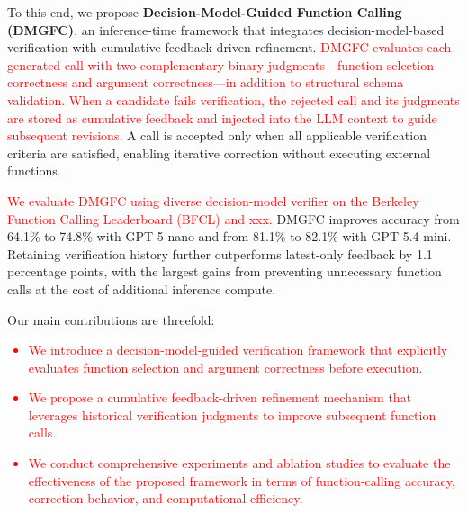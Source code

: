 To this end, we propose \textbf{Decision-Model-Guided Function Calling (DMGFC)}, an inference-time framework that integrates decision-model-based verification with cumulative feedback-driven refinement. \textcolor{red}{DMGFC evaluates each generated call with two complementary binary judgments---function selection correctness and argument correctness---in addition to structural schema validation. When a candidate fails verification, the rejected call and its judgments are stored as cumulative feedback and injected into the LLM context to guide subsequent revisions.} A call is accepted only when all applicable verification criteria are satisfied, enabling iterative correction without executing external functions.

\textcolor{red}{We evaluate DMGFC using diverse decision-model verifier on the Berkeley Function Calling Leaderboard (BFCL) and xxx.} DMGFC improves accuracy from 64.1\% to 74.8\% with GPT-5-nano and from 81.1\% to 82.1\% with GPT-5.4-mini. Retaining verification history further outperforms latest-only feedback by 1.1 percentage points, with the largest gains from preventing unnecessary function calls at the cost of additional inference compute.

Our main contributions are threefold:
\textcolor{red}{
\begin{itemize}
    \item We introduce a decision-model-guided verification framework that explicitly evaluates function selection and argument correctness before execution.
    \item We propose a cumulative feedback-driven refinement mechanism that leverages historical verification judgments to improve subsequent function calls.
    \item We conduct comprehensive experiments and ablation studies to evaluate the effectiveness of the proposed framework in terms of function-calling accuracy, correction behavior, and computational efficiency.
\end{itemize}}